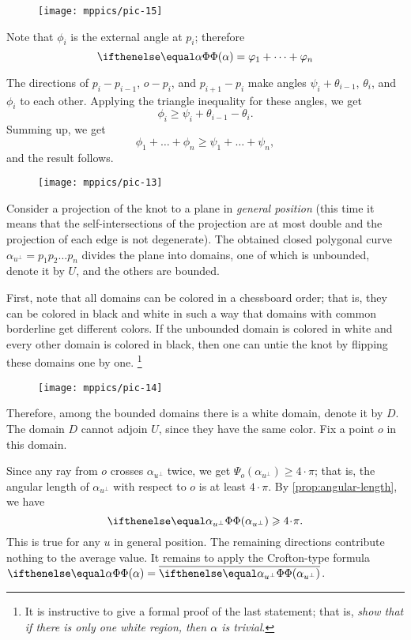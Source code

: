 \begin{wrapfigure}{r}{45 mm}
\vskip-0mm
\centering
\texttt{[image: mppics/pic-15]}
\vskip0mm
\end{wrapfigure}

Note that $\phi_i$ is the external angle at $p_i$;
therefore 
\[\tc\alpha= \phi_1+\dots+\phi_n\]

The directions of $p_i-p_{i-1}$, $o-p_i$, and $p_{i+1}-p_i$ make angles 
$\psi_i+\theta_{i-1}$, $\theta_i$, and $\phi_i$ to each other.
Applying the triangle inequality for these angles, we get
\[\phi_i\ge \psi_i+\theta_{i-1}-\theta_i.\]
Summing up, we get
\[\phi_1+\dots+\phi_n\ge \psi_1+\dots+\psi_n,\]
and the result follows.
\qeds


\begin{wrapfigure}{r}{44 mm}
\vskip-0mm
\centering
\texttt{[image: mppics/pic-13]}
\vskip0mm
\end{wrapfigure}

Consider a projection of the knot to a plane in \emph{general position}
(this time it means that the self-intersections of the projection are at most double and the projection of each edge is not degenerate).
The obtained closed polygonal curve $\alpha_{u^\perp}=p_1p_2\dots p_n$ divides the plane into domains, one of which is unbounded, denote it by $U$, and the others are bounded.

First, note that all domains can be colored in a chessboard order;
that is, they can be colored in black and white in such a way that domains with common borderline get different colors.
If the unbounded domain is colored in white and every other domain is colored in black, then one can untie the knot by flipping these domains one by one.%
\footnote{It is instructive to give a formal proof of the last statement; that is, \textit{show that if there is only one white region, then $\alpha$ is trivial}.}


\begin{wrapfigure}{r}{44 mm}
\vskip-4mm
\centering
\texttt{[image: mppics/pic-14]}
\vskip0mm
\end{wrapfigure}

Therefore, among the bounded domains there is a white domain, denote it by $D$.
The domain $D$ cannot adjoin %
$U$, since they have the same color.
Fix a point $o$ in this domain.

Since any ray from $o$ crosses $\alpha_{u^\perp}$ twice, we get $\Psi_o(\alpha_{u^\perp})\ge 4\cdot\pi$;
that is, the angular length of $\alpha_{u^\perp}$ with respect to $o$ is at least $4\cdot\pi$. 
By \ref{prop:angular-length}, we have 
\[\tc{\alpha_{u^\perp}}\ge4\cdot\pi.\]
This is true for any $u$ in general position.
The remaining directions contribute nothing to the average value.
It remains to apply the Crofton-type formula $\tc{\alpha}=\overline{\tc{\alpha_{u^\perp}}}$.
\qeds
